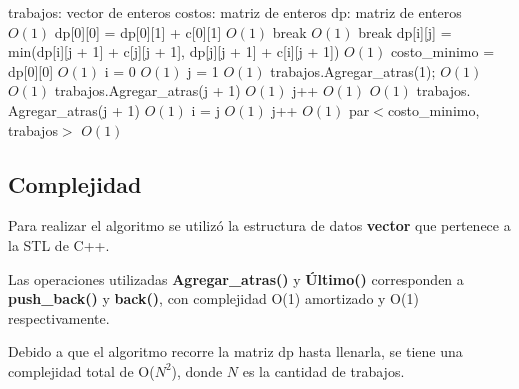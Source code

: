 \documentclass[a4paper, 10pt, twoside]{article}
\newenvironment{pseudo}[1][]{%
    \vspace{0.5em}%
    \begin{algorithmic}%
}
{%
    \end{algorithmic}%
    \vspace{0.5em}%
}
\newcommand{\Ode}[1]{\hfill $O(#1)$}
\begin{document}
\begin{pseudo}

\State trabajos: vector de enteros
\State costos: matriz de enteros
\State dp: matriz de enteros
\\
                             \Ode{1}
                \State dp[0][0] = dp[0][1] + c[0][1]  \Ode{1}
                \State break                          
            \EndIf
                                           \Ode{1}
                \State break
            \EndIf
            \State dp[i][j] = min(dp[i][j + 1] + c[j][j + 1], dp[j][j + 1] + c[i][j + 1])                          \Ode{1}
        \EndFor
    \EndFor
    \State costo\_minimo = dp[0][0]                    \Ode{1}
    \State i = 0                                       \Ode{1}
    \State j = 1                                       \Ode{1}
    \State trabajos$.$Agregar\_atras(1);
            \Ode{1}
                \Ode{1}
            \State trabajos$.$Agregar\_atras(j + 1)    \Ode{1}
            \State j++                                 \Ode{1}
            \EndIf
        \Else
                \Ode{1}
            \State trabajos$.$Agregar\_atras(j + 1)    \Ode{1}
            \State i = j                               \Ode{1}  
            \State j++                                 \Ode{1}
            \EndIf
        \EndIf
    \EndWhile
    \Return par$<$costo\_minimo, trabajos$>$ \Ode{1}
    \EndProcedure
\end{pseudo}



\subsection{Complejidad}

Para realizar el algoritmo se utilizó la estructura de datos \textbf{vector} que pertenece a la STL de C++.

Las operaciones utilizadas \textbf{Agregar\_atras()} y \textbf{Último()} corresponden a \textbf{push\_back()} y \textbf{back()}, con complejidad O(1) amortizado y O(1) respectivamente.

Debido a que el algoritmo recorre la matriz dp hasta llenarla, se tiene una complejidad total de O($N^2$), donde $N$ es la cantidad de trabajos.
\end{document}
